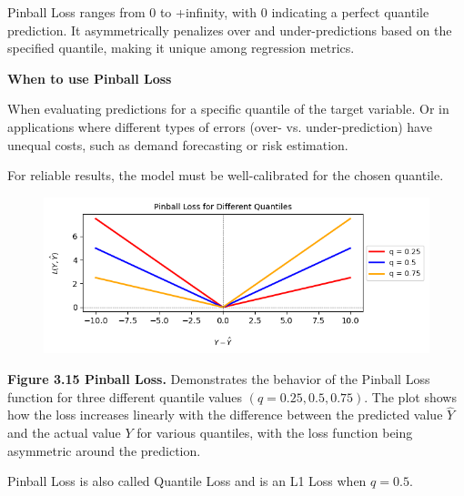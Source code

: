 Pinball Loss ranges from 0 to +infinity, with 0 indicating a perfect quantile prediction. It asymmetrically penalizes over and under-predictions based on the specified quantile,
making it unique among regression metrics.

\textbf{When to use Pinball Loss}

When evaluating predictions for a specific quantile of the target variable. Or in applications where different types of errors (over- vs. under-prediction) 
have unequal costs, such as demand forecasting or risk estimation.

{
    \item For reliable results, the model must be well-calibrated for the chosen quantile.
}

\clearpage

\thispagestyle{customstyle}

\begin{figure}[ht!]
    \centering
    \includegraphics[width=\textwidth]{figures/Pinball_Loss.png}
    \label{Pinball_Loss}
\end{figure}


\textbf{Figure 3.15 Pinball Loss.} Demonstrates the behavior of the Pinball Loss function for three different quantile values $(q = 0.25, 0.5, 0.75)$.
The plot shows how the loss increases linearly with the difference between the predicted value $\hat{Y}$ and the actual value $Y$ for various quantiles, with the loss function being asymmetric around the prediction.

{Pinball Loss is also called Quantile Loss and is an L1 Loss when $q=0.5$.}

\clearpage
\thispagestyle{regressionstyle}

